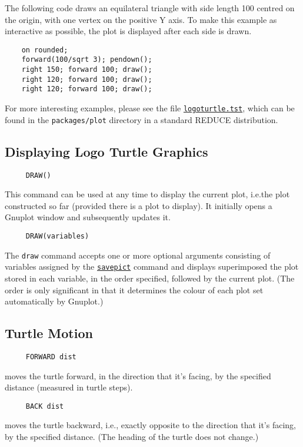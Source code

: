 The following code draws an equilateral triangle with side length 100
centred on the origin, with one vertex on the positive Y axis.  To
make this example as interactive as possible, the plot is displayed
after each side is drawn.
\begin{verbatim}
    on rounded;
    forward(100/sqrt 3); pendown();
    right 150; forward 100; draw();
    right 120; forward 100; draw();
    right 120; forward 100; draw();
\end{verbatim}

For more interesting examples, please see the file
\href{https://sourceforge.net/p/reduce-algebra/code/HEAD/tree/trunk/packages/plot/logoturtle.tst}{\texttt{logoturtle.tst}},
which can be found in the \texttt{packages/plot} directory in a
standard REDUCE distribution.


\subsection{Displaying Logo Turtle Graphics}

\begin{verbatim}
     DRAW()
\end{verbatim}
\label{logoturtle:draw}
This command can be used at any time to display the current plot,
i.e.\@ the plot constructed so far (provided there is a plot to
display).  It initially opens a Gnuplot window and subsequently
updates it.

\begin{verbatim}
     DRAW(variables)
\end{verbatim}
The \texttt{draw} command accepts one or more optional arguments
consisting of variables assigned by the
\hyperref[logoturtle:savepict]{\texttt{savepict}} command and
displays superimposed the plot stored in each variable, in the order
specified, followed by the current plot.  (The order is only
significant in that it determines the colour of each plot set
automatically by Gnuplot.)


\subsection{Turtle Motion}

\begin{verbatim}
     FORWARD dist
\end{verbatim}
moves the turtle forward, in the direction that it's facing, by the
specified distance (measured in turtle steps).

\begin{verbatim}
     BACK dist
\end{verbatim}
moves the turtle backward, i.e., exactly opposite to the direction
that it's facing, by the specified distance.  (The heading of the
turtle does not change.)

